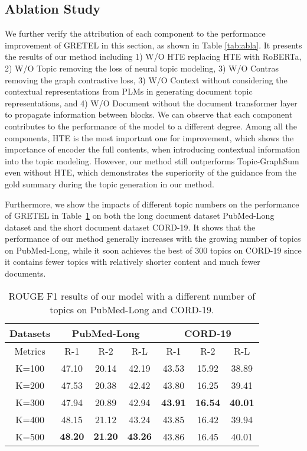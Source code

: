 \documentclass[11pt]{article}
\begin{document}
\subsection{Ablation Study} 
We further verify the attribution of each component to the performance improvement of GRETEL in this section, as shown in Table \ref{tab:abla}.
It presents the results of our method including 1) W/O HTE replacing HTE with RoBERTa, 
2) W/O Topic removing the loss of neural topic modeling, 3) W/O Contras removing the graph contrastive loss, 3) W/O Context without considering the contextual representations from PLMs in generating document topic representations, and
4) W/O Document without the document transformer layer to propagate information between blocks.
We can observe that each component contributes to the performance of the model to a different degree.
Among all the components, HTE is the most important one for improvement, which shows the importance of encoder the full contents, when introducing contextual information into the topic modeling.
However, our method still outperforms Topic-GraphSum even without HTE, which demonstrates the superiority of the guidance from the gold summary during the topic generation in our method.


Furthermore, we show the impacts of different topic numbers on the performance of GRETEL in Table~\ref{tab:topic} on both the long document dataset PubMed-Long dataset and the short document dataset CORD-19.
It shows that the performance of our method generally increases with the growing number of topics on PubMed-Long, while it soon achieves the best of 300 topics on CORD-19 since it contains fewer topics with relatively shorter content and much fewer documents.
\begin{table}[!hbt]
\scriptsize
    \centering
\begin{tabular}{c|c|c|c|c|c|c}
    \hline
    \bf{Datasets}  & \multicolumn{3}{c|}{\bf{PubMed-Long}} & \multicolumn{3}{c}{\bf{CORD-19}}\\ 
    \hline
    Metrics&	R-1&	R-2&	R-L&R-1&R-2&R-L\\
    \hline
    K=100&47.10&20.14&42.19&43.53&15.92&38.89\\
    K=200&47.53&20.38&42.42&43.80&16.25&39.41\\
    K=300&47.94&20.89&42.94&\textbf{43.91}&\textbf{16.54}&\textbf{40.01}\\
    K=400&48.15&21.12&43.24&43.85&16.42&39.94\\
K=500&$\textbf{48.20}$&$\textbf{21.20}$&$\textbf{43.26}$&43.86&16.45&40.01\\
    \hline
    \end{tabular}
\caption{ROUGE F1 results of our model with a different number of topics on PubMed-Long and CORD-19.}
    \label{tab:topic}
\end{table}
\end{document}
